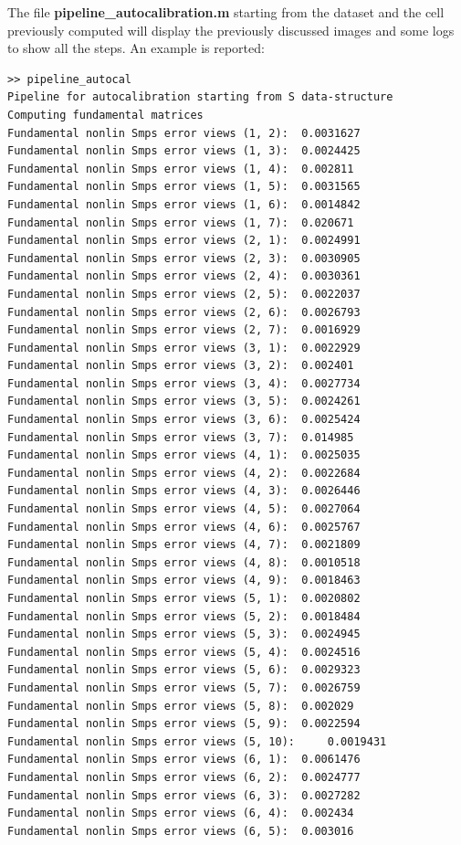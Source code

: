 \documentclass[12pt]{article}
\begin{document}
\bigskip
\noindent The file \textbf{pipeline\_autocalibration.m} starting from the dataset and the cell previously computed will display the previously discussed images and some logs to show all the steps. An example is reported:
\begin{verbatim}
>> pipeline_autocal
Pipeline for autocalibration starting from S data-structure
Computing fundamental matrices
Fundamental nonlin Smps error views (1, 2):	 0.0031627 
Fundamental nonlin Smps error views (1, 3):	 0.0024425 
Fundamental nonlin Smps error views (1, 4):	 0.002811 
Fundamental nonlin Smps error views (1, 5):	 0.0031565 
Fundamental nonlin Smps error views (1, 6):	 0.0014842 
Fundamental nonlin Smps error views (1, 7):	 0.020671 
Fundamental nonlin Smps error views (2, 1):	 0.0024991 
Fundamental nonlin Smps error views (2, 3):	 0.0030905 
Fundamental nonlin Smps error views (2, 4):	 0.0030361 
Fundamental nonlin Smps error views (2, 5):	 0.0022037 
Fundamental nonlin Smps error views (2, 6):	 0.0026793 
Fundamental nonlin Smps error views (2, 7):	 0.0016929 
Fundamental nonlin Smps error views (3, 1):	 0.0022929 
Fundamental nonlin Smps error views (3, 2):	 0.002401 
Fundamental nonlin Smps error views (3, 4):	 0.0027734 
Fundamental nonlin Smps error views (3, 5):	 0.0024261 
Fundamental nonlin Smps error views (3, 6):	 0.0025424 
Fundamental nonlin Smps error views (3, 7):	 0.014985 
Fundamental nonlin Smps error views (4, 1):	 0.0025035 
Fundamental nonlin Smps error views (4, 2):	 0.0022684 
Fundamental nonlin Smps error views (4, 3):	 0.0026446 
Fundamental nonlin Smps error views (4, 5):	 0.0027064 
Fundamental nonlin Smps error views (4, 6):	 0.0025767 
Fundamental nonlin Smps error views (4, 7):	 0.0021809 
Fundamental nonlin Smps error views (4, 8):	 0.0010518 
Fundamental nonlin Smps error views (4, 9):	 0.0018463 
Fundamental nonlin Smps error views (5, 1):	 0.0020802 
Fundamental nonlin Smps error views (5, 2):	 0.0018484 
Fundamental nonlin Smps error views (5, 3):	 0.0024945 
Fundamental nonlin Smps error views (5, 4):	 0.0024516 
Fundamental nonlin Smps error views (5, 6):	 0.0029323 
Fundamental nonlin Smps error views (5, 7):	 0.0026759 
Fundamental nonlin Smps error views (5, 8):	 0.002029 
Fundamental nonlin Smps error views (5, 9):	 0.0022594 
Fundamental nonlin Smps error views (5, 10):	 0.0019431 
Fundamental nonlin Smps error views (6, 1):	 0.0061476 
Fundamental nonlin Smps error views (6, 2):	 0.0024777 
Fundamental nonlin Smps error views (6, 3):	 0.0027282 
Fundamental nonlin Smps error views (6, 4):	 0.002434 
Fundamental nonlin Smps error views (6, 5):	 0.003016 

\end{verbatim}
\end{document}

